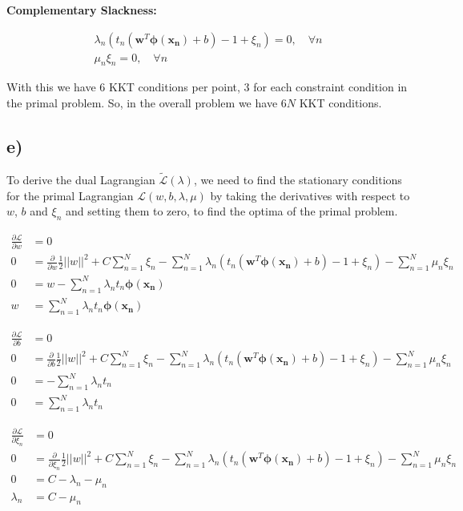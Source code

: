 \documentclass[12pt,a4paper,oneside]{paper}
\begin{document}
\textbf{Complementary Slackness:}

\begin{align*}
    \lambda_n \left( t_n (\bm{w}^T \bm{\phi(x_n)} + b) - 1 + \xi_n \right) = 0, \quad \forall n \\
    \mu_n \xi_n = 0, \quad \forall n
\end{align*}

With this we have 6 KKT conditions per point, 3 for each constraint condition in the primal problem. So, 
in the overall problem we have $6N$ KKT conditions.

\newpage
\subsection*{e)}

To derive the dual Lagrangian $\tilde{\mathcal{L} }(\lambda)$, we need to find the stationary conditions for the primal Lagrangian $\mathcal{L} (w, b, \lambda, \mu)$
by taking the derivatives with respect to $w$, $b$ and $\xi_n$ and setting them to zero, to find the optima of the primal problem.

\begin{align*}
    \frac{\partial \mathcal{L} }{\partial w} &= 0 \\
    0 &= \frac{\partial}{\partial w} \frac{1}{2} ||w||^2 + C \sum_{n=1}^{N} \xi_n - \sum_{n=1}^{N} \lambda_n \left( t_n (\bm{w}^T \bm{\phi(x_n)} + b) - 1 + \xi_n \right) - \sum_{n=1}^{N} \mu_n \xi_n \\
    0 &= w - \sum_{n=1}^{N} \lambda_n t_n \bm{\phi(x_n)} \\
    w &= \sum_{n=1}^{N} \lambda_n t_n \bm{\phi(x_n)}
\end{align*}

\begin{align*}
    \frac{\partial \mathcal{L} }{\partial b} &= 0 \\
    0 &= \frac{\partial}{\partial b} \frac{1}{2} ||w||^2 + C \sum_{n=1}^{N} \xi_n - \sum_{n=1}^{N} \lambda_n \left( t_n (\bm{w}^T \bm{\phi(x_n)} + b) - 1 + \xi_n \right) - \sum_{n=1}^{N} \mu_n \xi_n \\
    0 &= -\sum_{n=1}^{N} \lambda_n t_n \\
    0 &= \sum_{n=1}^{N} \lambda_n t_n
\end{align*}

\begin{align*}
    \frac{\partial \mathcal{L} }{\partial \xi_n} &= 0 \\
    0 &= \frac{\partial}{\partial \xi_n} \frac{1}{2} ||w||^2 + C \sum_{n=1}^{N} \xi_n - \sum_{n=1}^{N} \lambda_n \left( t_n (\bm{w}^T \bm{\phi(x_n)} + b) - 1 + \xi_n \right) - \sum_{n=1}^{N} \mu_n \xi_n \\
    0 &= C - \lambda_n - \mu_n \\
    \lambda_n &= C - \mu_n
\end{align*}
\end{document}
